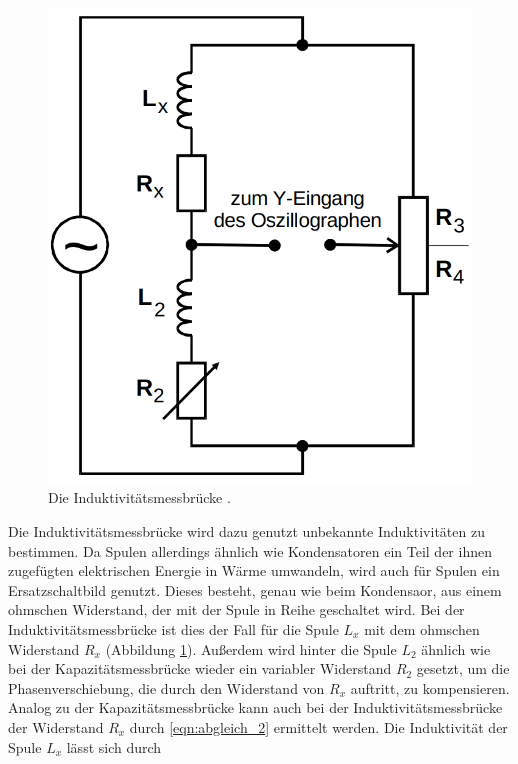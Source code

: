 \begin{figure}
    \centering
    \includegraphics[scale=0.25]{content/Induktivitaetsmessbruecke.png}
    \caption{Die Induktivitätsmessbrücke \cite[S. 221]{anleitung}.}
    \label{fig:induk}
\end{figure}

Die Induktivitätsmessbrücke wird dazu genutzt unbekannte Induktivitäten zu bestimmen.
Da Spulen allerdings ähnlich wie Kondensatoren ein Teil der ihnen zugefügten elektrischen Energie in Wärme umwandeln,
wird auch für Spulen ein Ersatzschaltbild genutzt. Dieses besteht, genau wie beim Kondensaor,
aus einem ohmschen Widerstand, der mit der Spule in Reihe geschaltet wird.
Bei der Induktivitätsmessbrücke ist dies der Fall für die Spule $L_x$ mit dem ohmschen Widerstand $R_x$ (Abbildung \ref{fig:induk}).
Außerdem wird hinter die Spule $L_2$ ähnlich wie bei der Kapazitätsmessbrücke wieder ein variabler Widerstand $R_2$ gesetzt, 
um die Phasenverschiebung, die durch den Widerstand von $R_x$ auftritt, zu kompensieren.
Analog zu der Kapazitätsmessbrücke kann auch bei der Induktivitätsmessbrücke der Widerstand $R_x$ durch \eqref{eqn:abgleich_2} ermittelt werden.
Die Induktivität der Spule $L_x$ lässt sich durch

